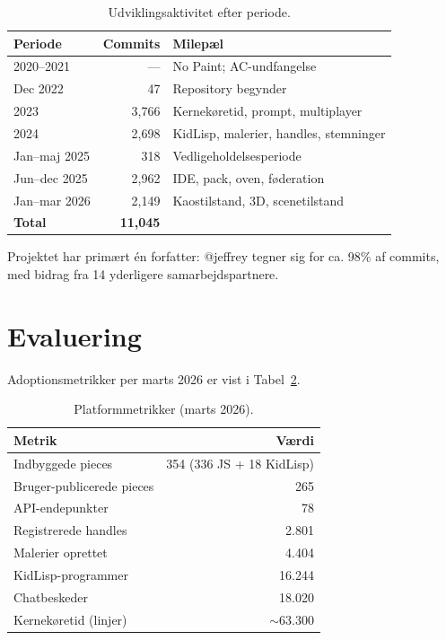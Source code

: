 \documentclass[10pt,letterpaper,twocolumn]{article}
\begin{document}
\begin{table}[h]
\small
\centering
\begin{tabular}{lrl}
\toprule
\textbf{Periode} & \textbf{Commits} & \textbf{Milepæl} \\
\midrule
2020--2021 & --- & No Paint; AC-undfangelse \\
Dec 2022 & 47 & Repository begynder \\
2023 & 3{,}766 & Kernekøretid, prompt, multiplayer \\
2024 & 2{,}698 & KidLisp, malerier, handles, stemninger \\
Jan--maj 2025 & 318 & Vedligeholdelsesperiode \\
Jun--dec 2025 & 2{,}962 & IDE, pack, oven, føderation \\
Jan--mar 2026 & 2{,}149 & Kaostilstand, 3D, scenetilstand \\
\midrule
\textbf{Total} & \textbf{11{,}045} & \\
\bottomrule
\end{tabular}
\caption{Udviklingsaktivitet efter periode.}
\label{tab:history}
\end{table}

Projektet har primært én forfatter: @jeffrey tegner sig for ca. 98\% af commits, med bidrag fra 14 yderligere samarbejdspartnere.


\section{Evaluering}
\label{sec:evaluation}

Adoptionsmetrikker per marts 2026 er vist i Tabel~\ref{tab:adoption}.

\begin{table}[h]
\small
\centering
\begin{tabular}{lr}
\toprule
\textbf{Metrik} & \textbf{Værdi} \\
\midrule
Indbyggede pieces & 354 (336 JS + 18 KidLisp) \\
Bruger-publicerede pieces & 265 \\
API-endepunkter & 78 \\
Registrerede handles & 2.801 \\
Malerier oprettet & 4.404 \\
KidLisp-programmer & 16.244 \\
Chatbeskeder & 18.020 \\
Kernekøretid (linjer) & $\sim$63.300 \\
\bottomrule
\end{tabular}
\caption{Platformmetrikker (marts 2026).}
\label{tab:adoption}
\end{table}
\end{document}
